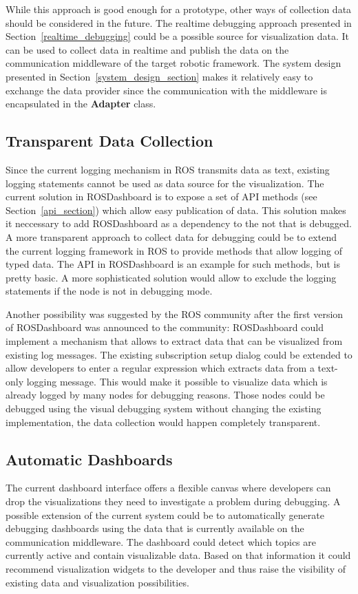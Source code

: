 While this approach is good enough for a prototype, other ways of collection data should be considered in the future. The realtime debugging approach presented in Section~\ref{realtime_debugging} could be a possible source for visualization data. It can be used to collect data in realtime and publish the data on the communication middleware of the target robotic framework. The system design presented in Section~\ref{system_design_section} makes it relatively easy to exchange the data provider since the communication with the middleware is encapsulated in the \textbf{Adapter} class.

\subsection{Transparent Data Collection}
Since the current logging mechanism in ROS transmits data as text, existing logging statements cannot be used as data source for the visualization. The current solution in ROSDashboard is to expose a set of API methods (see Section~\ref{api_section}) which allow easy publication of data. This solution makes it neccessary to add ROSDashboard as a dependency to the not that is debugged. A more transparent approach to collect data for debugging could be to extend the current logging framework in ROS to provide methods that allow logging of typed data. The API in ROSDashboard is an example for such methods, but is pretty basic. A more sophisticated solution would allow to exclude the logging statements if the node is not in debugging mode.

Another possibility was suggested by the ROS community after the first version of ROSDashboard was announced to the community: ROSDashboard could implement a mechanism that allows to extract data that can be visualized from existing log messages. The existing subscription setup dialog could be extended to allow developers to enter a regular expression which extracts data from a text-only logging message. This would make it possible to visualize data which is already logged by many nodes for debugging reasons. Those nodes could be debugged using the visual debugging system without changing the existing implementation, the data collection would happen completely transparent.

\subsection{Automatic Dashboards}
The current dashboard interface offers a flexible canvas where developers can drop the visualizations they need to investigate a problem during debugging. A possible extension of the current system could be to automatically generate debugging dashboards using the data that is currently available on the communication middleware. The dashboard could detect which topics are currently active and contain visualizable data. Based on that information it could recommend visualization widgets to the developer and thus raise the visibility of existing data and visualization possibilities.

